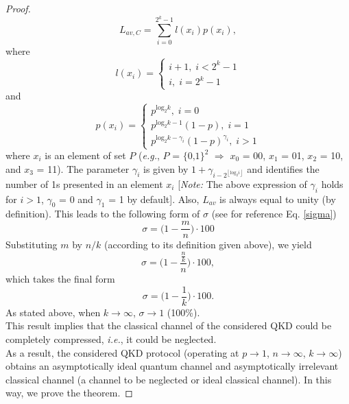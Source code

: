 \documentclass[journal,onecolumn]{IEEEtran}
\theoremstyle{thmstyleone}%
\theoremstyle{thmstyletwo}%
\theoremstyle{thmstylethree}%
\begin{document}
\begin{proof}
		\begin{equation}
			L_{av,C} = \sum_{i=\text{0}}^{{\text{2}}^k-\text{1}} l(x_i)p(x_i),
		\end{equation}
		where 
		\begin{equation}
			l(x_i) = \begin{cases}
				i+\text{1}, \; i < {\text{2}}^k-\text{1} \\
				i, \; i = {\text{2}}^k-\text{1}
			\end{cases}
		\end{equation}
		and
		\begin{equation}
			p(x_i) = \begin{cases}
				p^{\text{log}_{\text{2}}k},  \; i=\text{0}  \\
				p^{\text{log}_{\text{2}}k-\text{1}}(\text{1}-p), \; i=\text{1} \\
				p^{\text{log}_{\text{2}}k-\gamma_i}(\text{1}-p)^{\gamma_i}, \; i > \text{1}
			\end{cases}
		\end{equation}
		where $x_i$ is an element of set $P$ (\textit{e.g.}, $P$ = $\{\text{0,1}\}^{\text{2}}$ $\Rightarrow$ $x_{\text{0}}$ = 00, $x_{\text{1}}$ = 01, $x_{\text{2}}$ = 10, and $x_{\text{3}}$ = 11). The parameter $\gamma_i$ is given by $\text{1}+\gamma_{i-\text{2}^{\left \lfloor{\text{log}_\text{2}i}\right \rfloor}}$ and identifies the number of 1s presented in an element $x_i$ [\textit{Note:} The above expression of $\gamma_i$ holds for $i>\text{1}$, $\gamma_{\text{0}}$ = 0 and $\gamma_{\text{1}}$ = 1 by default].  Also, $L_{av}$ is always equal to unity (by definition). This leads to the following form of $\sigma$ (see for reference Eq. \eqref{sigma})
		\begin{equation}
			\sigma = \Big(\text{1} - \frac{m}{n}\Big)\cdot \text{100}
		\end{equation}
		Substituting $m$ by $n/k$ (according to its definition given above), we yield
		\begin{equation}
			\sigma = \Big(\text{1} - \frac{\frac{n}{k}}{n}\Big)\cdot \text{100},
		\end{equation}
		which takes the final form
		\begin{equation}
			\sigma = \Big(\text{1} - \frac{\text{1}}{k}\Big)\cdot \text{100}.
		\end{equation}
		As stated above, when $k\rightarrow\infty$, $\sigma\rightarrow\text{1}$ (100\%).\\
		\indent This result implies that the classical channel of the considered QKD could be completely compressed, \textit{\textit{i.e.}}, it could be neglected. \\
		\indent As a result, the considered QKD protocol (operating at $p\rightarrow \text{1}$, $n\rightarrow\infty$, $k\rightarrow\infty$) obtains an asymptotically ideal quantum channel and asymptotically irrelevant classical channel (a channel to be neglected or ideal classical channel). In this way, we prove the theorem. 
	\end{proof}
	
\end{document}

